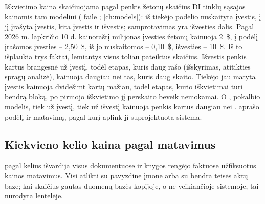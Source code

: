 Iškvietimo kaina skaičiuojama pagal penkis žetonų skaičius DI tinklų sąsajos kainomis tam
modeliui ( faile ; \cref{ch:models}): iš tiekėjo
podėlio nuskaityta įvestis, į jį įrašyta įvestis, kita įvestis ir išvestis; samprotavimas
yra išvesties dalis. Pagal 2026 m. lapkričio 10 d. kainoraštį  milijonas
įvesties žetonų kainuoja 2~\$, į podėlį įrašomos įvesties -- 2,50~\$, iš jo nuskaitomos --
0,10~\$, išvesties -- 10~\$. Iš to išplaukia trys faktai, lemiantys visus toliau pateiktus
skaičius. Išvestis penkis kartus brangesnė už įvestį, todėl etapas, kuris daug rašo
(išskyrimas, atitikties spragų analizė), kainuoja daugiau nei tas, kuris daug skaito.
Tiekėjo jau matyta įvestis kainuoja dvidešimt kartų mažiau, todėl etapas, kurio iškvietimai
turi bendrą bloką, po pirmojo iškvietimo jį perskaito beveik nemokamai. O
, pokalbio modelis, tiek už įvestį, tiek už išvestį kainuoja penkis kartus
daugiau nei .  aprašo podėlį ir matavimą, pagal kurį
aplink jį suprojektuota sistema.

\subsection{Kiekvieno kelio kaina pagal matavimus}

 pagal kelius išvardija visus dokumentuose ir knygos rengėjo faktuose
užfiksuotus kainos matavimus. Visi atlikti su pavyzdine įmone arba su bendra teisės aktų baze;
kai skaičius gautas duomenų bazės kopijoje, o ne veikiančioje sistemoje, tai nurodyta
lentelėje.

